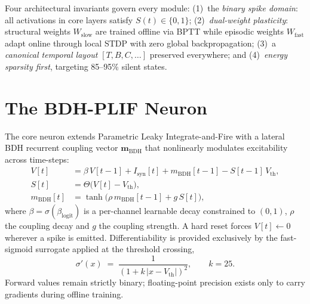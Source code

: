 \documentclass[11pt]{article}
\newcommand{\Wslow}{W_{\text{slow}}}
\newcommand{\Wfast}{W_{\text{fast}}}
\begin{document}
Four architectural invariants govern every module: (1)~the \emph{binary
spike domain}: all activations in core layers satisfy $S(t)\in\{0,1\}$;
(2)~\emph{dual-weight plasticity}: structural weights $\Wslow$ are trained
offline via BPTT while episodic weights $\Wfast$ adapt online through local
STDP with zero global backpropagation; (3)~a \emph{canonical temporal
layout} $[T,B,C,\dots]$ preserved everywhere; and (4)~\emph{energy sparsity
first}, targeting 85--95\% silent states.

\section{The BDH-PLIF Neuron}
The core neuron extends Parametric Leaky Integrate-and-Fire with a lateral
BDH recurrent coupling vector $\mathbf{m}_{\text{BDH}}$ that nonlinearly
modulates excitability across time-steps:
\begin{align}
V[t] &= \beta\, V[t-1] + I_{\text{syn}}[t] + m_{\text{BDH}}[t-1]
        - S[t-1]\,V_{\text{th}}, \label{eq:mem}\\
S[t] &= \Theta\!\big(V[t] - V_{\text{th}}\big), \label{eq:spike}\\
m_{\text{BDH}}[t] &= \tanh\!\big(\rho\, m_{\text{BDH}}[t-1]
        + g\, S[t]\big), \label{eq:mbdh}
\end{align}
where $\beta=\sigma(\beta_{\text{logit}})$ is a per-channel learnable decay
constrained to $(0,1)$, $\rho$ the coupling decay and $g$ the coupling
strength. A hard reset forces $V[t]\leftarrow 0$ wherever a spike is
emitted. Differentiability is provided exclusively by the fast-sigmoid
surrogate applied at the threshold crossing,
\begin{equation}
\sigma'(x) \;=\; \frac{1}{\left(1 + k\,|x - V_{\text{th}}|\right)^2},
\qquad k = 25 .
\label{eq:surrogate}
\end{equation}
Forward values remain strictly binary; floating-point precision exists only
to carry gradients during offline training.
\end{document}
